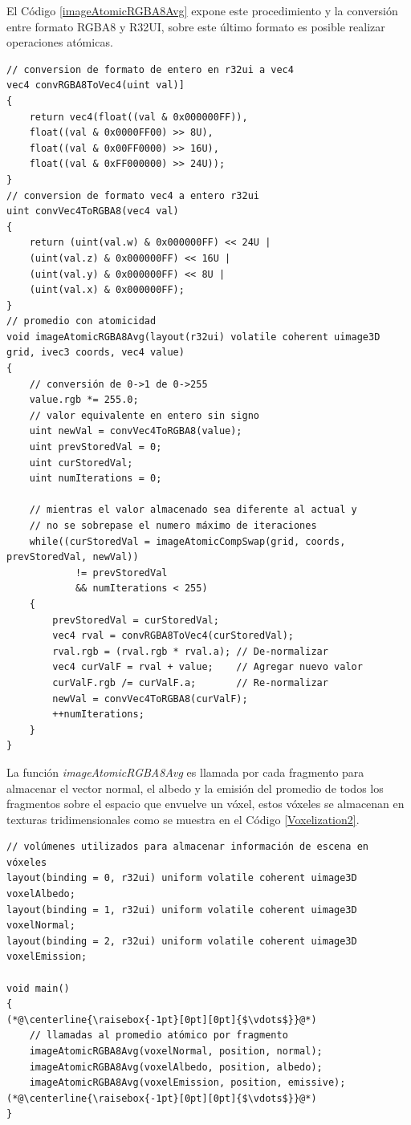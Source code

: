 El Código \ref{imageAtomicRGBA8Avg} expone este procedimiento y la conversión entre formato RGBA8 y R32UI, sobre este último formato es posible realizar operaciones atómicas.
\\
\begin{lstlisting}[caption={Conversion entre RGBA8 y R32UI y promedio incremental.}, label=imageAtomicRGBA8Avg]
// conversion de formato de entero en r32ui a vec4
vec4 convRGBA8ToVec4(uint val)]
{
    return vec4(float((val & 0x000000FF)), 
    float((val & 0x0000FF00) >> 8U), 
    float((val & 0x00FF0000) >> 16U), 
    float((val & 0xFF000000) >> 24U));
}
// conversion de formato vec4 a entero r32ui
uint convVec4ToRGBA8(vec4 val)
{
    return (uint(val.w) & 0x000000FF) << 24U | 
    (uint(val.z) & 0x000000FF) << 16U | 
    (uint(val.y) & 0x000000FF) << 8U | 
    (uint(val.x) & 0x000000FF);
}
// promedio con atomicidad
void imageAtomicRGBA8Avg(layout(r32ui) volatile coherent uimage3D grid, ivec3 coords, vec4 value)
{
    // conversión de 0->1 de 0->255
    value.rgb *= 255.0;
    // valor equivalente en entero sin signo
    uint newVal = convVec4ToRGBA8(value);
    uint prevStoredVal = 0;
    uint curStoredVal;
    uint numIterations = 0;

    // mientras el valor almacenado sea diferente al actual y 
    // no se sobrepase el numero máximo de iteraciones
    while((curStoredVal = imageAtomicCompSwap(grid, coords, prevStoredVal, newVal)) 
            != prevStoredVal
            && numIterations < 255)
    {
        prevStoredVal = curStoredVal;
        vec4 rval = convRGBA8ToVec4(curStoredVal);
        rval.rgb = (rval.rgb * rval.a); // De-normalizar
        vec4 curValF = rval + value;    // Agregar nuevo valor
        curValF.rgb /= curValF.a;       // Re-normalizar
        newVal = convVec4ToRGBA8(curValF);
        ++numIterations;
    }
}
\end{lstlisting}

La función \emph{imageAtomicRGBA8Avg} es llamada por cada fragmento para almacenar el vector normal, el albedo y la emisión del promedio de todos los fragmentos sobre el espacio que envuelve un vóxel, estos vóxeles se almacenan en texturas tridimensionales como se muestra en el Código \ref{Voxelization2}.
\\
\begin{lstlisting}[caption={Composición de fragmentos y vóxeles}, label=Voxelization2]
// volúmenes utilizados para almacenar información de escena en vóxeles
layout(binding = 0, r32ui) uniform volatile coherent uimage3D voxelAlbedo;
layout(binding = 1, r32ui) uniform volatile coherent uimage3D voxelNormal;
layout(binding = 2, r32ui) uniform volatile coherent uimage3D voxelEmission;

void main()
{
(*@\centerline{\raisebox{-1pt}[0pt][0pt]{$\vdots$}}@*)
    // llamadas al promedio atómico por fragmento
    imageAtomicRGBA8Avg(voxelNormal, position, normal);
    imageAtomicRGBA8Avg(voxelAlbedo, position, albedo);
    imageAtomicRGBA8Avg(voxelEmission, position, emissive);
(*@\centerline{\raisebox{-1pt}[0pt][0pt]{$\vdots$}}@*)
}
\end{lstlisting}

